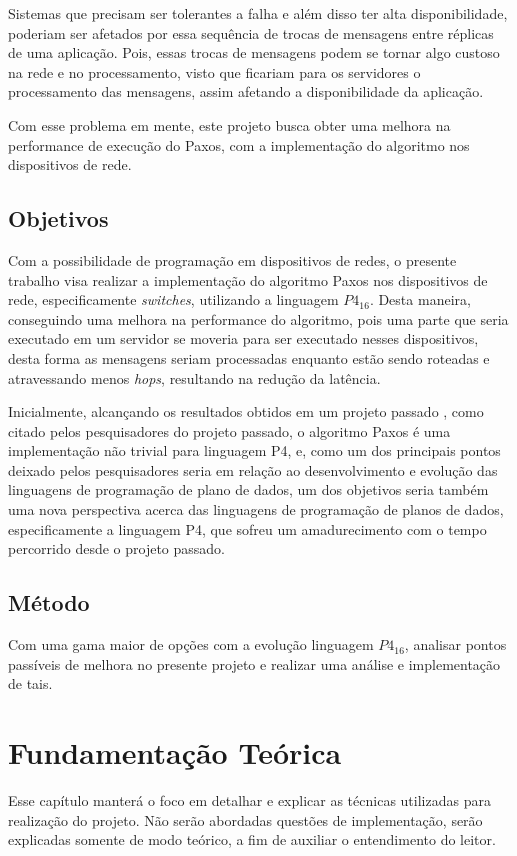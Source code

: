 \documentclass[12pt,
openright, 
oneside,
a4paper,
brazil]{facom-ufu-abntex2}
\begin{document}
Sistemas que precisam ser tolerantes a falha e além disso ter alta disponibilidade, 
poderiam ser afetados por essa sequência de trocas de mensagens entre réplicas de uma aplicação.
Pois, essas trocas de mensagens podem se tornar algo custoso na rede e no processamento,
visto que ficariam para os servidores o processamento das mensagens, assim afetando a 
disponibilidade da aplicação. 

Com esse problema em mente, este projeto busca obter uma melhora na performance de execução
do Paxos, com a implementação do algoritmo nos dispositivos de rede.


\section{Objetivos}
Com a possibilidade de programação em dispositivos de redes, o presente trabalho 
visa realizar a implementação do algoritmo Paxos nos dispositivos
de rede, especificamente \textit{switches}, utilizando a linguagem $P4_{16}$. 
Desta maneira, conseguindo uma melhora na performance do algoritmo, pois uma parte 
que seria executado em um servidor se moveria para ser executado nesses dispositivos, desta
forma as mensagens seriam processadas enquanto estão sendo roteadas e atravessando menos
\textit{hops}, resultando na redução da latência.

Inicialmente, alcançando os resultados obtidos em um projeto passado \citep{dang2016paxos},
como citado pelos pesquisadores do projeto passado, o algoritmo Paxos é uma implementação
não trivial para linguagem P4, e, como um dos principais pontos deixado pelos pesquisadores
seria em relação ao desenvolvimento e evolução das linguagens de programação de plano de dados,
um dos objetivos seria também uma nova perspectiva acerca das linguagens de programação de 
planos de dados, especificamente a linguagem P4, que sofreu um amadurecimento com o tempo 
percorrido desde o projeto passado.

\section{Método}
Com uma gama maior de opções com a evolução linguagem $P4_{16}$, 
analisar pontos passíveis de melhora no presente projeto e realizar uma 
análise e implementação de tais.


\chapter{Fundamentação Teórica}
Esse capítulo manterá o foco em detalhar e explicar as técnicas utilizadas
para realização do projeto. Não serão abordadas questões de implementação,
serão explicadas somente de modo teórico, a fim de auxiliar o entendimento do leitor.
\end{document}

